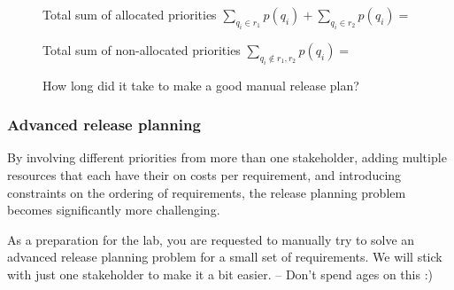\documentclass[11pt]{article}
\begin{document}
\begin{framed}
\begin{tabular}{| p{8mm} | p{12mm} | p{12mm} | p{1.4cm} | p{1.4cm} | p{1.4cm} |  p{1.4cm} |}
\hline
\end{tabular}
\begin{description}
\item[] \vspace{1em}Total sum of allocated priorities 
$\sum\limits_{q_i \in r_1} p(q_i)  + \sum\limits_{q_i \in r_2} p(q_i) = $ \underline{\hspace{3cm}}
\item[] \vspace{1em}Total sum of non-allocated priorities
$\sum\limits_{q_i \not\in r_1, r_2} p(q_i) = $ \hspace{8.5mm}\underline{\hspace{3cm}}
\item[] \vspace{1em}How long did it take to make a good manual release plan? \hspace{8.5mm}\underline{\hspace{2.3cm}}
\end{description}
\end{framed}

    

\subsubsection{Advanced release planning}\label{section:advRP}
By involving different priorities from more than one stakeholder, adding multiple resources that each have their on costs per requirement, and introducing constraints on the ordering of requirements, the release planning problem becomes significantly more challenging. 

As a preparation for the lab, you are requested to manually try to solve an advanced release planning problem for a small set of requirements. We will stick with just one stakeholder to make it a bit easier. --  Don't spend ages on this :)
\end{document}
